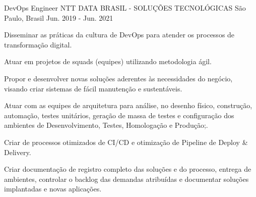 \begin{cventries}
  \cventry
    {DevOps Engineer} %
    {NTT DATA BRASIL - SOLUÇÕES TECNOLÓGICAS} %
    {São Paulo, Brasil} %
    {Jun. 2019 - Jun. 2021} %
    {
      \begin{cvitems} %
        \item {Disseminar as práticas da cultura de DevOps para atender os processos de
        transformação digital.}
        \item {Atuar em projetos de squads (equipes) utilizando metodologia ágil.}
        \item {Propor e desenvolver novas soluções aderentes às necessidades do negócio, visando
        criar sistemas de fácil manutenção e sustentáveis.}
        \item {Atuar com as equipes de arquitetura para análise, no desenho físico, construção,
        automação, testes unitários, geração de massa de testes e configuração dos
        ambientes de Desenvolvimento, Testes, Homologação e Produção;.}
        \item {Criar de processos otimizados de CI/CD e otimização de Pipeline de Deploy &
        Delivery.}
        \item {Criar documentação de registro completo das soluções e do processo,
        entrega de ambientes, controlar o backlog das demandas atribuídas e documentar
        soluções implantadas e novas aplicações.}
      \end{cvitems}
    }


\end{cventries}
